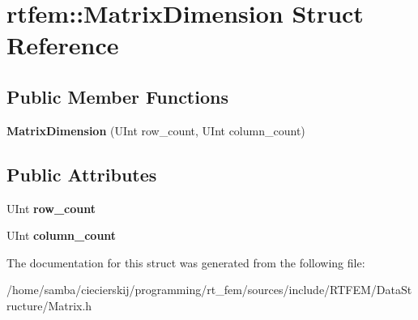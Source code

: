 \hypertarget{structrtfem_1_1MatrixDimension}{}\section{rtfem\+:\+:Matrix\+Dimension Struct Reference}
\label{structrtfem_1_1MatrixDimension}
\subsection*{Public Member Functions}
\begin{DoxyCompactItemize}
\item 
\mbox{\label{structrtfem_1_1MatrixDimension_a22e1da879f8a239966aacda6b979104a}} 
{\bfseries Matrix\+Dimension} (U\+Int row\+\_\+count, U\+Int column\+\_\+count)
\end{DoxyCompactItemize}
\subsection*{Public Attributes}
\begin{DoxyCompactItemize}
\item 
\mbox{\label{structrtfem_1_1MatrixDimension_ae1d43e50bba3d2df49cc3003478a632b}} 
U\+Int {\bfseries row\+\_\+count}
\item 
\mbox{\label{structrtfem_1_1MatrixDimension_a94b11c07cb4cc1bcc9e5df9cb3159b9d}} 
U\+Int {\bfseries column\+\_\+count}
\end{DoxyCompactItemize}


The documentation for this struct was generated from the following file\+:\begin{DoxyCompactItemize}
\item 
/home/samba/ciecierskij/programming/rt\+\_\+fem/sources/include/\+R\+T\+F\+E\+M/\+Data\+Structure/Matrix.\+h\end{DoxyCompactItemize}
